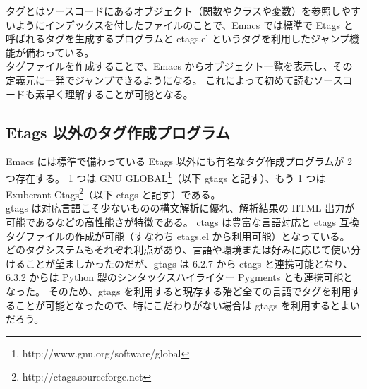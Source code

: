 タグとはソースコードにあるオブジェクト（関数やクラスや変数）を参照しやすいようにインデックスを付したファイルのことで、Emacs では標準で Etags と呼ばれるタグを生成するプログラムと etags.el というタグを利用したジャンプ機能が備わっている。\\

タグファイルを作成することで、Emacs からオブジェクト一覧を表示し、その定義元に一発でジャンプできるようになる。
これによって初めて読むソースコードも素早く理解することが可能となる。
\subsection{Etags 以外のタグ作成プログラム}
Emacs には標準で備わっている Etags 以外にも有名なタグ作成プログラムが 2 つ存在する。
1 つは GNU GLOBAL\footnote{http://www.gnu.org/software/global}（以下 gtags と記す）、もう 1 つは Exuberant Ctags\footnote{http://ctags.sourceforge.net}（以下 ctags と記す）である。\\

gtags は対応言語こそ少ないものの構文解析に優れ、解析結果の HTML 出力が可能であるなどの高性能さが特徴である。\enlargethispage{1.75zw}
ctags は豊富な言語対応と etags 互換タグファイルの作成が可能（すなわち etags.el から利用可能）となっている。\\

どのタグシステムもそれぞれ利点があり、言語や環境または好みに応じて使い分けることが望ましかったのだが、gtags は 6.2.7 から ctags と連携可能となり、6.3.2 からは Python 製のシンタックスハイライター Pygments とも連携可能となった。
そのため、gtags を利用すると現存する殆ど全ての言語でタグを利用することが可能となったので、特にこだわりがない場合は gtags を利用するとよいだろう。
